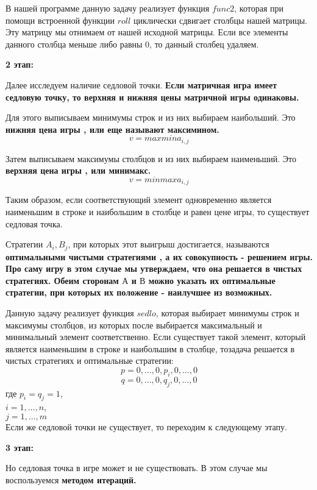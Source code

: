 \documentclass[12pt,a4paper]{paper}
\begin{document}
В нашей программе данную задачу реализует функция $func2$, которая при помощи встроенной функции $roll$ циклически сдвигает столбцы нашей матрицы. Эту матрицу мы отнимаем от нашей исходной матрицы. Если все элементы данного столбца меньше либо равны 0, то данный столбец удаляем. 

  \hline  \hline
\begin{center}
\bfseries\large{2 этап:}\\
\end{center}

Далее исследуем наличие седловой точки. \bfseries{Если матричная игра имеет седловую точку, то верхняя и нижняя цены матричной игры одинаковы.} \mdseries 

Для этого выписываем минимумы строк и из них выбираем наибольший. Это \bfseries{нижняя цена игры} \mdseries, или еще называют \bfseries{максимином.} \mdseries
$$v = max min a_{i,j}$$

Затем выписываем максимумы столбцов и из них выбираем наименьший. Это \bfseries{верхняя цена игры} \mdseries, или \bfseries{минимакс.} \mdseries
$$v = min max a_{i,j}$$

Таким образом, если соответствующий элемент одновременно является наименьшим в строке и наибольшим в столбце и равен цене игры, то существует седловая точка.

Стратегии $A_i,B_j$, при которых этот выигрыш достигается, называются \bfseries{оптимальными чистыми стратегиями} \mdseries, а их совокупность - \bfseries{решением игры.} \mdseries Про саму игру в этом случае мы утверждаем, что она решается в чистых стратегиях. Обеим сторонам $А$ и $В$ можно указать их оптимальные стратегии, при которых их положение - наилучшее из возможных.

Данную задачу реализует функция $sedlo$, которая выбирает минимумы строк и максимумы столбцов, из которых после выбирается максимальный и минимальный элемент соответственно. Если существует такой элемент, который является наименьшим в строке и наибольшим в столбце, тозадача решается в чистых стратегиях и оптимальные стратегии: $$p = {0, \dots, 0, p_i, 0, \dots, 0}$$
$$q = {0, \dots, 0, q_j, 0, \dots, 0} $$
где $p_i =  q_j = 1$,\\
$i = 1, \dots, n $,\\
$j = 1, \dots, m $\\

Если же седловой точки не существует, то переходим к следующему этапу.
  \hline  \hline

\begin{center}
\bfseries\large{3 этап:}\\
\end{center}
Но седловая точка в игре может и не существовать. В этом случае мы воспользуемся \bfseries{методом итераций.} \mdseries
\end{document}
